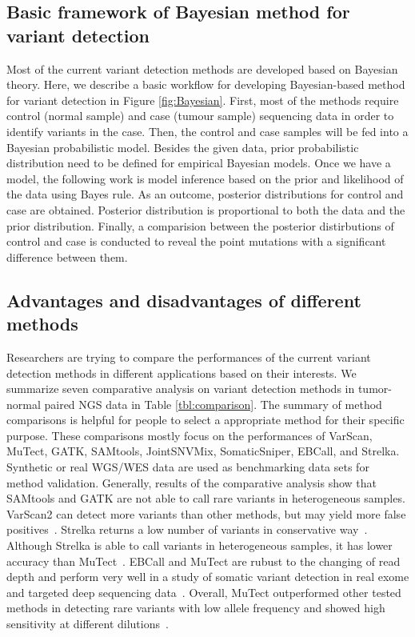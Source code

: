\documentclass[a4,center,fleqn]{NAR}
\begin{document}
\subsection{Basic framework of Bayesian method for variant detection}

Most of the current variant detection methods are developed based on Bayesian theory. 
Here, we describe a basic workflow for developing Bayesian-based method for variant detection in Figure \ref{fig:Bayesian}.
First, most of the methods require control (normal sample) and case (tumour sample) sequencing data in order to identify variants in the case.
Then, the control and case samples will be fed into a Bayesian probabilistic model. 
Besides the given data, prior probabilistic distribution need to be defined for empirical Bayesian models.
Once we have a model, the following work is model inference based on the prior and likelihood of the data using Bayes rule.
As an outcome, posterior distributions for control and case are obtained.
Posterior distribution is proportional to both the data and the prior distribution. 
Finally, a comparision between the posterior distirbutions of control and case is conducted to reveal the point mutations with a significant difference between them.




\subsection{Advantages and disadvantages of different methods}

Researchers are trying to compare the performances of the current variant detection methods in different applications based on their interests.
We summarize seven comparative analysis on variant detection methods in tumor-normal paired NGS data in Table \ref{tbl:comparison}.
The summary of method comparisons is helpful for people to select a appropriate method for their specific purpose.
These comparisons mostly focus on the performances of VarScan, MuTect, GATK, SAMtools, JointSNVMix, SomaticSniper, EBCall, and Strelka.
Synthetic or real WGS/WES data are used as benchmarking data sets for method validation.
Generally, results of the comparative analysis show that SAMtools and GATK are not able to call rare variants in heterogeneous samples.
VarScan2 can detect more variants than other methods, but may yield more false positives~\citep{wang2013detecting, Spencer2014}.
Strelka returns a low number of variants in conservative way~\citep{kroigaard2016evaluation}.
Although Strelka is able to call variants in heterogeneous samples, it has lower accuracy than MuTect~\citep{wang2013detecting}.
EBCall and MuTect are rubust to the changing of read depth and perform very well in a study of somatic variant detection in real exome and targeted deep sequencing data~\citep{kroigaard2016evaluation}.
Overall, MuTect outperformed other tested methods in detecting rare variants with low allele frequency and showed high sensitivity at different dilutions~\citep{wang2013detecting, Xu2014}.
\end{document}
